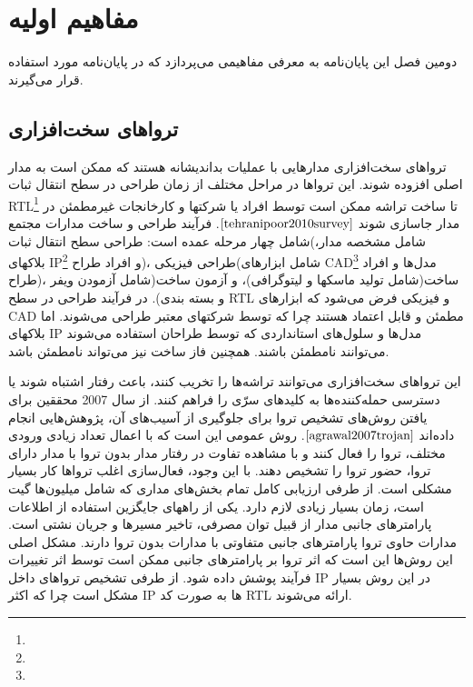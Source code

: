 

\chapter{مفاهیم اولیه}

دومین فصل این پایان‌نامه به معرفی مفاهیمی می‌پردازد که در پایان‌نامه مورد استفاده قرار می‌گیرند.




\section{ترواهای سخت‌افزاری}
تروا‌های سخت‌افزاری مدارهایی با عملیات بداندیشانه هستند که ممکن است به مدار اصلی افزوده شوند. این تروا‌ها در مراحل مختلف از زمان طراحی در سطح انتقال ثبات RTL\footnote{} تا ساخت تراشه ممکن است توسط افراد یا شرکتها و کارخانجات غیرمطمئن در مدار جاسازی شوند
$\cite{tehranipoor2010survey}$. 
فرآیند طراحی و ساخت مدارات مجتمع شامل چهار مرحله عمده است: طراحی سطح انتقال ثبات(شامل مشخصه مدار، بلاکهای IP\footnote{} و افراد طراح)، طراحی فیزیکی(شامل ابزارهای CAD\footnote{} مدل‌ها و افراد طراح)، ساخت(شامل تولید ماسکها و لیتوگرافی)، و آزمون ساخت(شامل آزمودن ویفر و بسته بندی). در فرآیند طراحی در سطح RTL و فیزیکی فرض می‌شود که ابزارهای CAD مطمئن و قابل اعتماد هستند چرا که توسط شرکتهای معتبر طراحی می‌شوند. اما بلاکهای  IP مدل‌ها و سلول‌های استانداردی که توسط طراحان استفاده می‌شوند می‌توانند نامطمئن باشند. همچنین فاز ساخت نیز می‌تواند نامطمئن باشد.

این تروا‌های سخت‌افزاری می‌توانند تراشه‌ها را تخریب کنند، باعث رفتار اشتباه شوند یا دسترسی حمله‌کننده‌ها به کلیدهای سرّی را فراهم کنند. از سال 2007 محققین برای یافتن روش‌های تشخیص تروا برای جلوگیری از آسیب‌های آن، پژوهش‌هایی انجام داده‌اند $\cite{agrawal2007trojan}$. روش عمومی این است که با اعمال تعداد زیادی ورودی مختلف، تروا را فعال کنند و با مشاهده تفاوت در رفتار مدار بدون تروا با مدار دارای تروا، حضور تروا را تشخیص دهند. با این وجود، فعال‌سازی اغلب تروا‌ها کار بسیار مشکلی است. از طرفی ارزیابی کامل تمام بخش‌های مداری که شامل میلیون‌ها گیت است، زمان بسیار زیادی لازم دارد. یکی از راههای جایگزین استفاده از اطلاعات پارامترهای جانبی مدار از قبیل توان مصرفی، تاخیر مسیرها و جریان نشتی است. مدارات حاوی تروا پارامترهای جانبی متفاوتی با مدارات بدون تروا دارند. مشکل اصلی این روش‌ها این است که اثر تروا بر پارامترهای جانبی ممکن است توسط اثر تغییرات فرآیند پوشش داده شود. از طرفی تشخیص تروا‌های داخل IP‌ در این روش بسیار مشکل است چرا که اکثر IP ‌ها‌‌ به صورت کد RTL ارائه می‌شوند.

